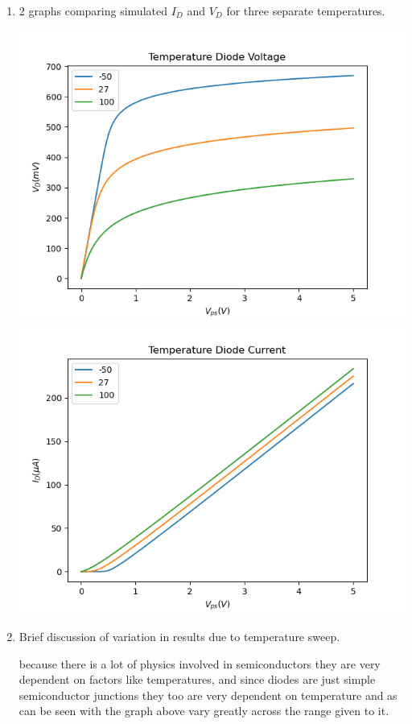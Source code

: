 \documentclass{article}
\begin{document}
\begin{enumerate}
\begin{center}
    \end{center}
    \newpage
    \item 2 graphs comparing simulated $I_D$ and $V_D$ for three separate temperatures.
    \begin{center}
        \includegraphics[width = .445\textwidth]{tempvd.png}
        \includegraphics[width = .445\textwidth]{tempid.png}
    \end{center}
    \item Brief discussion of variation in results due to temperature sweep.
    \begin{center}
        because there is a lot of physics involved in semiconductors they are very dependent on factors like temperatures, and since diodes are just simple semiconductor junctions they too are very dependent on temperature and as can be seen with the graph above vary greatly across the range given to it.
    \end{center}
\end{enumerate}
\end{document}
